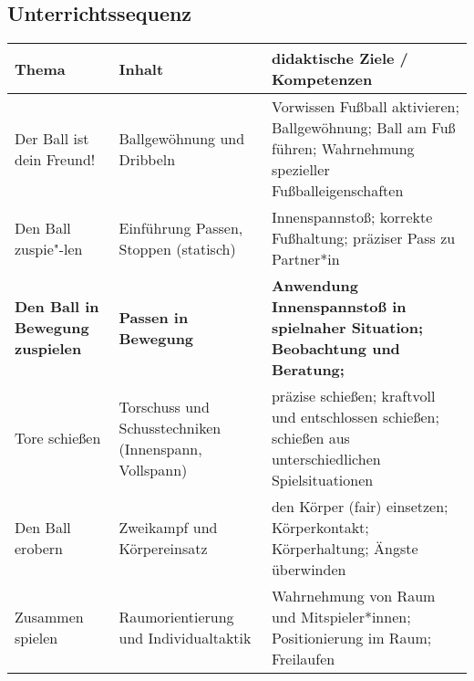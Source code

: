 \subsection{Unterrichtssequenz}
\begin{scriptsize}
\begin{singlespacing}

\begin{longtable}{|p{3.5cm}|p{4.5cm}|p{7cm}|}
\hline
\textbf{Thema} & \textbf{Inhalt} & \textbf{didaktische Ziele / Kompetenzen}

\\
\hline
Der Ball ist dein Freund!
&
Ballgewöhnung und Dribbeln
&
Vorwissen Fußball aktivieren; Ballgewöhnung; Ball am Fuß führen; Wahrnehmung spezieller Fußballeigenschaften

\\
\hline
Den Ball zuspie"-len
&
Einführung Passen, Stoppen (statisch)
&
Innenspannstoß; korrekte Fußhaltung; präziser Pass zu Partner*in

\\
\hline
\rowcolor{Gray}
\textbf{Den Ball in Bewegung zuspielen}
&
\textbf{Passen in Bewegung}
&
\textbf{Anwendung Innenspannstoß in spielnaher Situation; Beobachtung und Beratung;}

\\
\hline

Tore schießen
&
Torschuss und Schusstechniken (Innenspann, Vollspann)
&
präzise schießen; kraftvoll und entschlossen schießen; schießen aus unterschiedlichen Spielsituationen

\\
\hline

Den Ball erobern
&
Zweikampf und Körpereinsatz
&
den Körper (fair) einsetzen; Körperkontakt; Körperhaltung; Ängste überwinden

\\
\hline

Zusammen spielen
&
Raumorientierung und Individualtaktik
&
Wahrnehmung von Raum und Mitspieler*innen; Positionierung im Raum; Freilaufen
\\
\hline

\end{longtable}
\end{singlespacing}
\end{scriptsize}



\vspace{0.5cm}
